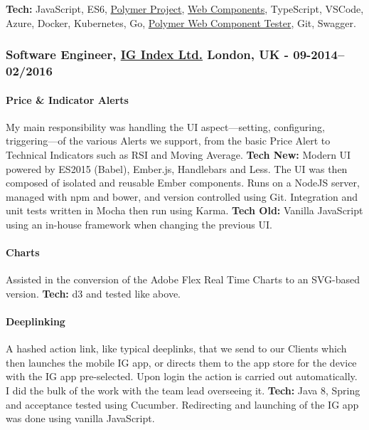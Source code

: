 \documentclass[
  a4paper,
]{article}
\begin{document}
\textbf{Tech:} JavaScript, ES6,
\href{https://www.polymer-project.org}{Polymer Project},
\href{https://www.webcomponents.org}{Web Components}, TypeScript,
VSCode, Azure, Docker, Kubernetes, Go,
\href{https://github.com/Polymer/web-component-tester}{Polymer Web
Component Tester}, Git, Swagger.

\hypertarget{software-engineer-ig-index-ltd.-london-uk---09-2014022016}{%
\subsubsection{\texorpdfstring{Software Engineer,
\href{https://www.ig.com/uk}{IG Index Ltd.} London, UK -
09-2014--02/2016}{Software Engineer, IG Index Ltd. London, UK - 09-2014--02/2016}}\label{software-engineer-ig-index-ltd.-london-uk---09-2014022016}}

\hypertarget{price-indicator-alerts}{%
\paragraph{Price \& Indicator Alerts}\label{price-indicator-alerts}}

My main responsibility was handling the UI aspect---setting,
configuring, triggering---of the various Alerts we support, from the
basic Price Alert to Technical Indicators such as RSI and Moving
Average. \textbf{Tech New:} Modern UI powered by ES2015 (Babel),
Ember.js, Handlebars and Less. The UI was then composed of isolated and
reusable Ember components. Runs on a NodeJS server, managed with npm and
bower, and version controlled using Git. Integration and unit tests
written in Mocha then run using Karma. \textbf{Tech Old:} Vanilla
JavaScript using an in-house framework when changing the previous UI.

\hypertarget{charts}{%
\paragraph{Charts}\label{charts}}

Assisted in the conversion of the Adobe Flex Real Time Charts to an
SVG-based version. \textbf{Tech:} d3 and tested like above.

\hypertarget{deeplinking}{%
\paragraph{Deeplinking}\label{deeplinking}}

A hashed action link, like typical deeplinks, that we send to our
Clients which then launches the mobile IG app, or directs them to the
app store for the device with the IG app pre-selected. Upon login the
action is carried out automatically. I did the bulk of the work with the
team lead overseeing it. \textbf{Tech:} Java 8, Spring and acceptance
tested using Cucumber. Redirecting and launching of the IG app was done
using vanilla JavaScript.
\end{document}
